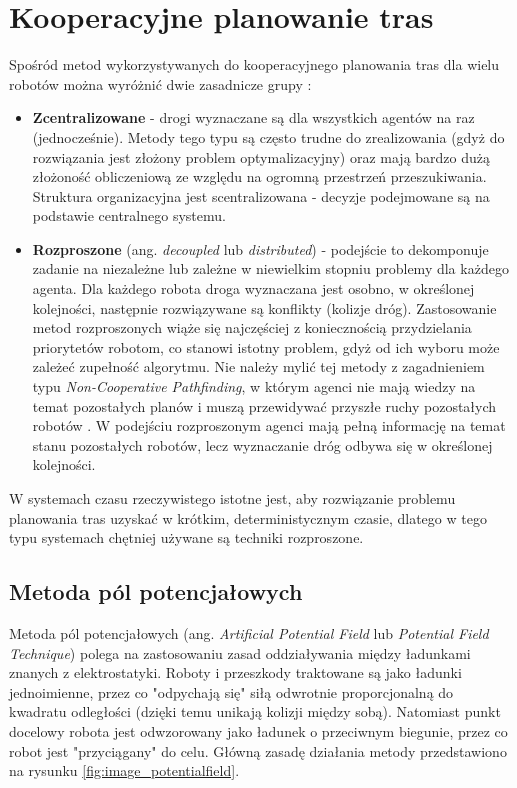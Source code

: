 \chapter{Kooperacyjne planowanie tras}
\label{ch:cooperative_pathfinding}

Spośród metod wykorzystywanych do kooperacyjnego planowania tras dla wielu robotów można wyróżnić dwie zasadnicze grupy \cite{latombe}:
\begin{itemize}
	\item {\bf Zcentralizowane} - drogi wyznaczane są dla wszystkich agentów na raz (jednocześnie). Metody tego typu są często trudne do zrealizowania (gdyż do rozwiązania jest złożony problem optymalizacyjny) oraz mają bardzo dużą złożoność obliczeniową ze względu na ogromną przestrzeń przeszukiwania. Struktura organizacyjna jest scentralizowana - decyzje podejmowane są na podstawie centralnego systemu.
	\item {\bf Rozproszone} (ang. {\it decoupled} lub {\it distributed}) - podejście to dekomponuje zadanie na niezależne lub zależne w niewielkim stopniu problemy dla każdego agenta. Dla każdego robota droga wyznaczana jest osobno, w określonej kolejności, następnie rozwiązywane są konflikty (kolizje dróg).
	Zastosowanie metod rozproszonych wiąże się najczęściej z koniecznością przydzielania priorytetów robotom, co stanowi istotny problem, gdyż od ich wyboru może zależeć zupełność algorytmu. Nie należy mylić tej metody z zagadnieniem typu {\it Non-Cooperative Pathfinding}, w którym agenci nie mają wiedzy na temat pozostałych planów i muszą przewidywać przyszłe ruchy pozostałych robotów \cite{cooppath}. W podejściu rozproszonym agenci mają pełną informację na temat stanu pozostałych robotów, lecz wyznaczanie dróg odbywa się w określonej kolejności.
\end{itemize}

W systemach czasu rzeczywistego istotne jest, aby rozwiązanie problemu planowania tras uzyskać w krótkim, deterministycznym czasie, dlatego w tego typu systemach chętniej używane są techniki rozproszone.

\section{Metoda pól potencjałowych}
Metoda pól potencjałowych (ang. {\it Artificial Potential Field} lub {\it Potential Field Technique}) polega na zastosowaniu zasad oddziaływania między ładunkami znanych z elektrostatyki. Roboty i przeszkody traktowane są jako ładunki jednoimienne, przez co "odpychają się" siłą odwrotnie proporcjonalną do kwadratu odległości (dzięki temu unikają kolizji między sobą). Natomiast punkt docelowy robota jest odwzorowany jako ładunek o przeciwnym biegunie, przez co robot jest "przyciągany" do celu.
Główną zasadę działania metody przedstawiono na rysunku \ref{fig:image_potentialfield}.

